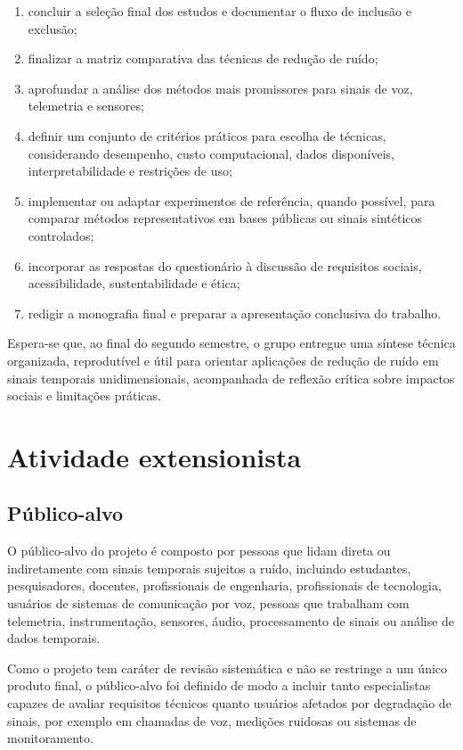 \begin{enumerate}[label=\alph*)]
    \item concluir a seleção final dos estudos e documentar o fluxo de inclusão e exclusão;
    \item finalizar a matriz comparativa das técnicas de redução de ruído;
    \item aprofundar a análise dos métodos mais promissores para sinais de voz, telemetria e sensores;
    \item definir um conjunto de critérios práticos para escolha de técnicas, considerando desempenho, custo computacional, dados disponíveis, interpretabilidade e restrições de uso;
    \item implementar ou adaptar experimentos de referência, quando possível, para comparar métodos representativos em bases públicas ou sinais sintéticos controlados;
    \item incorporar as respostas do questionário à discussão de requisitos sociais, acessibilidade, sustentabilidade e ética;
    \item redigir a monografia final e preparar a apresentação conclusiva do trabalho.
\end{enumerate}

Espera-se que, ao final do segundo semestre, o grupo entregue uma síntese técnica organizada, reprodutível e útil para orientar aplicações de redução de ruído em sinais temporais unidimensionais, acompanhada de reflexão crítica sobre impactos sociais e limitações práticas.

\newpage

\section{Atividade extensionista}

\subsection{Público-alvo}

O público-alvo do projeto é composto por pessoas que lidam direta ou indiretamente com sinais temporais sujeitos a ruído, incluindo estudantes, pesquisadores, docentes, profissionais de engenharia, profissionais de tecnologia, usuários de sistemas de comunicação por voz, pessoas que trabalham com telemetria, instrumentação, sensores, áudio, processamento de sinais ou análise de dados temporais.

Como o projeto tem caráter de revisão sistemática e não se restringe a um único produto final, o público-alvo foi definido de modo a incluir tanto especialistas capazes de avaliar requisitos técnicos quanto usuários afetados por degradação de sinais, por exemplo em chamadas de voz, medições ruidosas ou sistemas de monitoramento.

